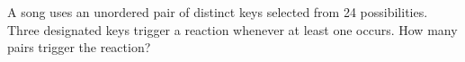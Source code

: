 A song uses an unordered pair of distinct keys selected from 24 possibilities. Three designated keys trigger a reaction whenever at least one occurs. How many pairs trigger the reaction?
